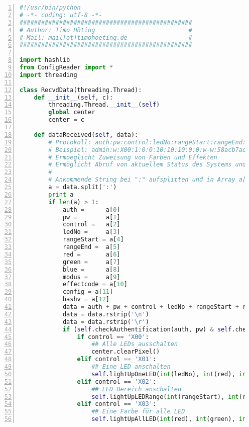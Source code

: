 \begin{lstlisting}[caption =Implementierung des Nachrichten-Verarbeitung in Python, language=python, frame=single, breaklines=true,columns=fullflexible, commentstyle=\color{gray}\upshape, captionpos=b, numbers = left]
#!/usr/bin/python
# -*- coding: utf-8 -*-
################################################
# Author: Timo Höting       				   #
# Mail: mail[at]timohoeting.de  			   #
################################################

import hashlib
from ConfigReader import *
import threading

class RecvdData(threading.Thread):
    def __init__(self, c):
        threading.Thread.__init__(self)
        global center
        center = c

    def dataReceived(self, data):
        # Protokoll: auth:pw:control:ledNo:rangeStart:rangeEnd:red:green:blue:modus:effectcode:config:hashv
        # Beispiel: admin:w:X00:1:0:0:10:10:10:0:0:w-w:58acb7acccce58ffa8b953b12b5a7702bd42dae441c1ad85057fa70b
        # Ermoeglicht Zuweisung von Farben und Effekten
        # Ermöglicht Abruf von aktuellem Status des Systems und der LEDs
        #
        # Ankommende String bei ":" aufsplitten und in Array a[] Speichern:
        a = data.split(':')
        print a
        if len(a) > 1:
            auth = 		a[0]
            pw = 		a[1]
            control = 	a[2]
            ledNo = 	a[3]
            rangeStart = a[4]
            rangeEnd = 	a[5]
            red = 		a[6]
            green = 	a[7]
            blue = 		a[8]
            modus = 	a[9]
            effectcode = a[10]
            config = a[11]
            hashv = a[12]
            data = auth + pw + control + ledNo + rangeStart + rangeEnd + red + green + blue + modus + effectcode + config
            data = data.rstrip('\n')
            data = data.rstrip('\r')
            if (self.checkAuthentification(auth, pw) & self.checkTransmissionData(data, hashv)):
                if control == 'X00':
                    ## Alle LEDs ausschalten
                    center.clearPixel()
                elif control == 'X01':
                    ## Eine LED anschalten
                    self.lightUpOneLED(int(ledNo), int(red), int(green), int(blue))
                elif control == 'X02':
                    ## LED Bereich anschalten
                    self.lightUpLEDRange(int(rangeStart), int(rangeEnd), int(red), int(green), int(blue))
                elif control == 'X03':
                    ## Eine Farbe für alle LED
                    self.lightUpAllLED(int(red), int(green), int(blue))

\end{lstlisting}
